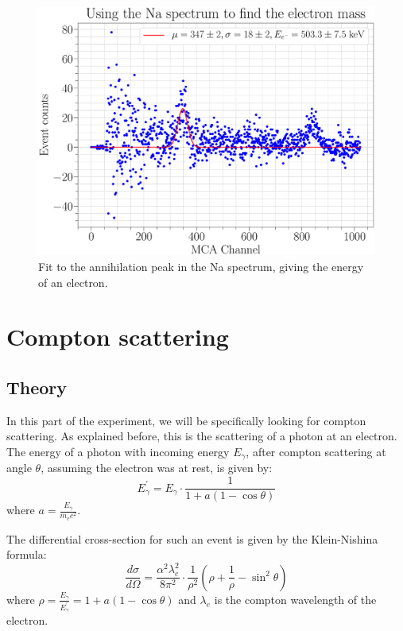 \documentclass[a4paper,12pt]{article}
\begin{document}
\begin{figure}[H]
	\centering
	\includegraphics[scale=0.25]{../Figures/Na_me.eps}
	\caption{Fit to the annihilation peak in the Na spectrum, giving the energy of an electron.}
	\label{efficiency}
\end{figure}

\clearpage
\section{Compton scattering}

\subsection{Theory}
In this part of the experiment, we will be specifically looking for compton scattering. As explained before, this is the scattering of a photon at an electron.
The energy of a photon with incoming energy $E_\gamma$, after compton scattering at angle $\theta$, assuming the electron was at rest, is given by: 
\begin{equation}\label{eq:compton}
	E_\gamma^\prime = E_\gamma \cdot \frac{1}{1+a(1-\cos\theta)} 
\end{equation}
where $a = \frac{E_\gamma}{m_e c^2}$.

The differential cross-section for such an event is given by the Klein-Nishina formula:
\begin{equation}
	\frac{d\sigma}{d\Omega} = \frac{\alpha^2\lambda_e^2}{8\pi^2} \cdot\frac{1}{\rho^2} \left(\rho+\frac{1}{\rho}-\sin^2\theta\right)
\end{equation}
where $\rho=\frac{E_\gamma}{E_\gamma^\prime} = 1+a(1-\cos\theta)$ and $\lambda_e$ is the compton wavelength of the electron.
\end{document}
